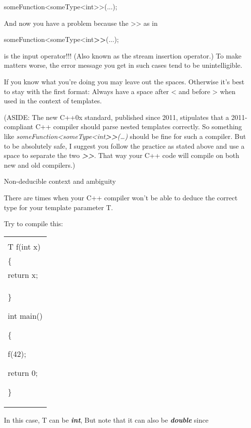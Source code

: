 \documentclass[
]{article}
\begin{document}
someFunction\textless someType\textless int\textgreater\textgreater(...);

And now you have a problem because the \textgreater\textgreater{} as in

someFunction\textless someType\textless int\textbf{\textgreater\textgreater{}}(...);

is the input operator!!! (Also known as the stream insertion operator.)
To make matters worse, the error message you get in such cases tend to
be unintelligible.

If you know what you're doing you may leave out the spaces. Otherwise
it's best to stay with the first format: Always have a space after
\textless{} and before \textgreater{} when used in the context of
templates.

(ASIDE: The new C++0x standard, published since 2011, stipulates that a
2011-compliant C++ compiler should parse nested templates correctly. So
something like
\emph{someFunction\textless someType\textless int\textbf{\textgreater\textgreater{}}(\ldots)}
should be fine for such a compiler. But to be absolutely safe, I suggest
you follow the practice as stated above and use a space to separate the
two \emph{\textbf{\textgreater\textgreater{}}}. That way your C++ code
will compile on both new and old compilers.)

Non-deducible context and ambiguity

There are times when your C++ compiler won't be able to deduce the
correct type for your template parameter T.

Try to compile this:

\begin{longtable}[]{@{}l@{}}
\toprule
\endhead
\begin{minipage}[t]{0.97\columnwidth}\raggedright
template \textless{} typename T \textgreater{}\\
T f(int x)\\
\{\\
return x;\\
\}

int main()

\{

f(42);

return 0;

\}\strut
\end{minipage}\tabularnewline
\bottomrule
\end{longtable}

In this case, T can be \emph{\textbf{int}}, But note that it can also be
\emph{\textbf{double}} since
\end{document}
